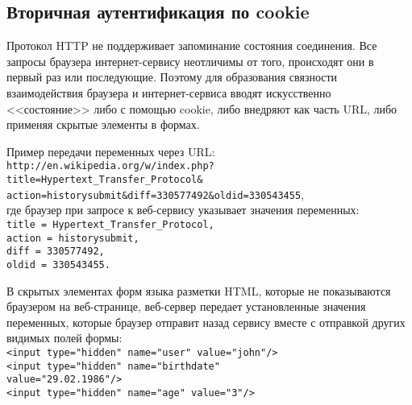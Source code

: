 \subsection{Вторичная аутентификация по cookie}

Протокол HTTP не поддерживает запоминание состояния соединения. Все запросы браузера интернет-сервису неотличимы от того, происходят они в первый раз или последующие. Поэтому для образования связности взаимодействия браузера и интернет-сервиса вводят искусственно <<состояние>> либо с помощью cookie, либо внедряют как часть URL, либо применяя скрытые элементы в формах.

Пример передачи переменных через URL: \\
\texttt{http://en.wikipedia.org/w/index.php? \\
\hspace*{1 cm} title=Hypertext\_Transfer\_Protocol\& \\
\hspace*{1 cm} action=historysubmit\&diff=330577492\&oldid=330543455}, \\
где браузер при запросе к веб-сервису указывает значения переменных: \texttt{ \\
\hspace*{1 cm} title = Hypertext\_Transfer\_Protocol, \\
\hspace*{1 cm} action = historysubmit, \\
\hspace*{1 cm} diff = 330577492, \\
\hspace*{1 cm} oldid = 330543455.
}

В скрытых элементах форм языка разметки HTML, которые не показываются браузером на веб-странице, веб-сервер передает установленные значения переменных, которые браузер отправит назад сервису вместе с отправкой других видимых полей формы: \texttt{ \\
\hspace*{1 cm} <input type="hidden"\ name="user"\ value="john"/> \\
\hspace*{1 cm} <input type="hidden"\ name="birthdate" \\
\hspace*{2 cm}      value="29.02.1986"/> \\
\hspace*{1 cm} <input type="hidden"\ name="age"\ value="3"/>
}

